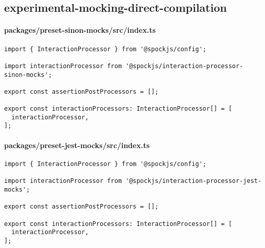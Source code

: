 \subsection*{experimental-mocking-direct-compilation}

\paragraph*{packages/preset-sinon-mocks/src/index.ts}
\begin{verbatim}
import { InteractionProcessor } from '@spockjs/config';

import interactionProcessor from '@spockjs/interaction-processor-sinon-mocks';

export const assertionPostProcessors = [];

export const interactionProcessors: InteractionProcessor[] = [
  interactionProcessor,
];
\end{verbatim}

\paragraph*{packages/preset-jest-mocks/src/index.ts}
\begin{verbatim}
import { InteractionProcessor } from '@spockjs/config';

import interactionProcessor from '@spockjs/interaction-processor-jest-mocks';

export const assertionPostProcessors = [];

export const interactionProcessors: InteractionProcessor[] = [
  interactionProcessor,
];
\end{verbatim}

